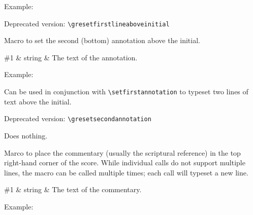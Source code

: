 Example:\par\medskip
\begin{latexcode}
\end{latexcode}

\smallskip\hspace{15pt} Deprecated version: \verb=\gresetfirstlineaboveinitial=

Macro to set the second (bottom) annotation above the initial.

\begin{argtable}
  \#1 & string & The text of the annotation.\\
\end{argtable}

Example:\par\medskip
\begin{latexcode}
\end{latexcode}

Can be used in conjunction with \verb=\setfirstannotation= to typeset
two lines of text above the initial.

\medskip
\begin{latexcode}
\end{latexcode}

\smallskip\hspace{15pt} Deprecated version: \verb=\gresetsecondannotation=

Does nothing.

Marco to place the commentary (usually the scriptural reference) in
the top right-hand corner of the score.  While individual calls do not
support multiple lines, the macro can be called multiple times; each
call will typeset a new line.

\begin{argtable}
  \#1 & string & The text of the commentary.\\
\end{argtable}

Example:\par\medskip
\begin{latexcode}
\end{latexcode}

